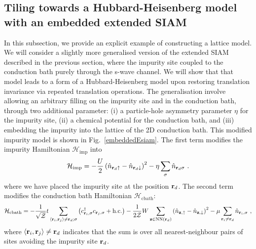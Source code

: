 \documentclass[reprint,hidelinks,onecolumn]{revtex4-2}
\begin{document}
\subsection{Tiling towards a Hubbard-Heisenberg model with an embedded extended SIAM}
In this subsection, we provide an explicit example of constructing a lattice model. We will consider a slightly more generalised version of the extended SIAM described in the previous section, where the impurity site coupled to the conduction bath purely through the s-wave channel. We will show that that model leads to a form of a Hubbard-Heisenberg model upon restoring translation invariance via repeated translation operations. The generalisation involve allowing an arbitrary filling on the impurity site and in the conduction bath, through two additional parameter: (i) a particle-hole asymmetry parameter \(\eta\) for the impurity site, (ii) a chemical potential for the conduction bath, and (iii) embedding the impurity into the lattice of the 2D conduction bath. This modified impurity model is shown in Fig.~\ref{embeddedEsiam}. The first term modifies the impurity Hamiltonian \(\mathcal{H}_\text{imp}\) into
\begin{equation}\begin{aligned}\label{onsiteHamiltonian}
	\mathcal{H}_\text{imp} = -\frac{U}{2}\left(\hat n_{{\bf r}_d \uparrow} - \hat n_{{\bf r}_d \downarrow} \right)^2 - \eta\sum_\sigma \hat n_{{\bf r}_d\sigma}~.
\end{aligned}\end{equation}
where we have placed the impurity site at the position \({\bf r}_d\). The second term modifies the conduction bath Hamiltonian \(\mathcal{H}_\text{cbath}\):
\begin{equation}\begin{aligned}\label{bathHamiltonian}
	\mathcal{H}_\text{cbath} = -\frac{1}{\sqrt\mathcal{Z}}t\sum_{\left<{\bf r}_i, {\bf r}_j\right>\neq{\bf r}_d;\sigma}\left(c^\dagger_{{\bf r}_i,\sigma}c_{{\bf r}_j,\sigma} + \text{h.c.}\right) - \frac{1}{2 \mathcal{Z}}W\sum_{{\bf z}\in\text{NN}({\bf r}_d)}\left(\hat n_{{\bf z}, \uparrow} - \hat n_{{\bf z}, \downarrow}\right)^2 - \mu \sum_{{\bf r}_i \neq {\bf r}_d}\hat n_{{\bf r}_i,\sigma}~,
\end{aligned}\end{equation}
where \(\left<{\bf r}_i, {\bf r}_j\right>\neq {\bf r}_d\) indicates that the sum is over all nearest-neighbour pairs of sites avoiding the impurity site \({\bf r}_d\).
\end{document}
